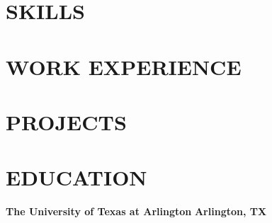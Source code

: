 \documentclass[11pt,letterpaper]{article}
\begin{document}



\section*{SKILLS}
    

\section*{WORK EXPERIENCE}


\section*{PROJECTS}

\vspace{0.3\baselineskip} %



\vspace{0.3\baselineskip} %



\section*{EDUCATION} %
\textbf{The University of Texas at Arlington} \hfill \textbf{Arlington, TX}\\
\end{document}
